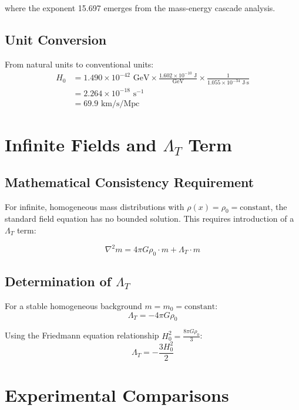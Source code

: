 \documentclass[12pt,a4paper]{article}
\begin{document}
	where the exponent 15.697 emerges from the mass-energy cascade analysis.
	
	\subsection{Unit Conversion}
	From natural units to conventional units:
	\begin{align}
		H_0 &= 1.490 \times 10^{-42} \text{ GeV} \times \frac{1.602 \times 10^{-10} \text{ J}}{\text{GeV}} \times \frac{1}{1.055 \times 10^{-34} \text{ J·s}} \\
		&= 2.264 \times 10^{-18} \text{ s}^{-1} \\
		&= 69.9 \text{ km/s/Mpc}
	\end{align}
	
	\section{Infinite Fields and $\Lambda_T$ Term}
	
	\subsection{Mathematical Consistency Requirement}
	For infinite, homogeneous mass distributions with $\rho(x) = \rho_0 = \text{constant}$, the standard field equation has no bounded solution. This requires introduction of a $\Lambda_T$ term:
	
	\begin{equation}
		\nabla^2 m = 4\pi G \rho_0 \cdot m + \Lambda_T \cdot m
	\end{equation}
	
	\subsection{Determination of $\Lambda_T$}
	For a stable homogeneous background $m = m_0 = \text{constant}$:
	\begin{equation}
		\Lambda_T = -4\pi G \rho_0
	\end{equation}
	
	Using the Friedmann equation relationship $H_0^2 = \frac{8\pi G \rho_0}{3}$:
	\begin{equation}
		\Lambda_T = -\frac{3H_0^2}{2}
	\end{equation}
	
	\section{Experimental Comparisons}
	
\end{document}
